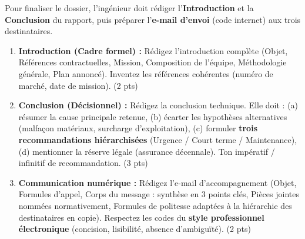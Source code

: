 \documentclass[11pt]{article}
\begin{document}
\begin{exercice}
Pour finaliser le dossier, l'ingénieur doit rédiger l'\textbf{Introduction} et la \textbf{Conclusion} du rapport, puis préparer l'\textbf{e-mail d'envoi} (code internet) aux trois destinataires.

\begin{enumerate}
    \item \textbf{Introduction (Cadre formel) :} Rédigez l'introduction complète (Objet, Références contractuelles, Mission, Composition de l'équipe, Méthodologie générale, Plan annoncé). Inventez les références cohérentes (numéro de marché, date de mission). (2 pts)
    \item \textbf{Conclusion (Décisionnel) :} Rédigez la conclusion technique. Elle doit : (a) résumer la cause principale retenue, (b) écarter les hypothèses alternatives (malfaçon matériaux, surcharge d'exploitation), (c) formuler \textbf{trois recommandations hiérarchisées} (Urgence / Court terme / Maintenance), (d) mentionner la réserve légale (assurance décennale). Ton impératif / infinitif de recommandation. (3 pts)
    \item \textbf{Communication numérique :} Rédigez l'e-mail d'accompagnement (Objet, Formules d'appel, Corps du message : synthèse en 3 points clés, Pièces jointes nommées normativement, Formules de politesse adaptées à la hiérarchie des destinataires en copie). Respectez les codes du \textbf{style professionnel électronique} (concision, lisibilité, absence d'ambiguïté). (2 pts)
\end{enumerate}
\end{exercice}
\end{document}
